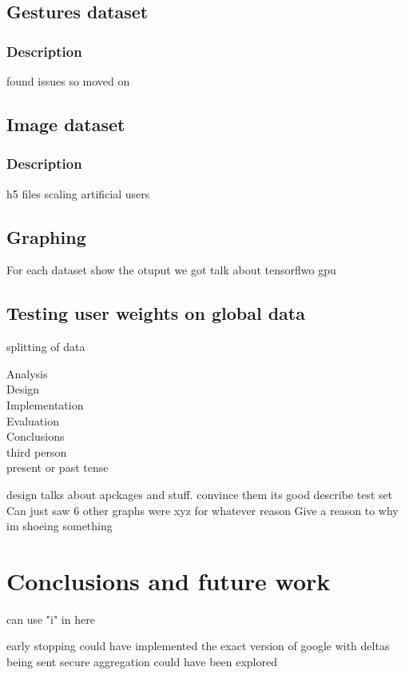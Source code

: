 \documentclass[12pt]{article}
\begin{document}
\subsection{Gestures dataset}\label{subsec:gestureset}
\subsubsection{Description}
found issues so moved on
\subsection{Image dataset}\label{subsec:imageset}
\subsubsection{Description}
h5 files
scaling
artificial users
\clearpage
\subsection{Graphing}
For each dataset show the otuput we got
talk about tensorflwo gpu
\subsection{Testing user weights on global data}
splitting of data 

Analysis\\
Design\\
Implementation\\
Evaluation\\
Conclusions\\

third person
\\
present or past tense

design talks about apckages and stuff. convince them its good
describe test set
Can just saw 6 other graphs were xyz for whatever reason
Give a reason to why im shoeing something

\clearpage
\section{Conclusions and future work}
can use "i" in here

early stopping
could have implemented the exact version of google with deltas being sent
secure aggregation could have been explored
\end{document}
